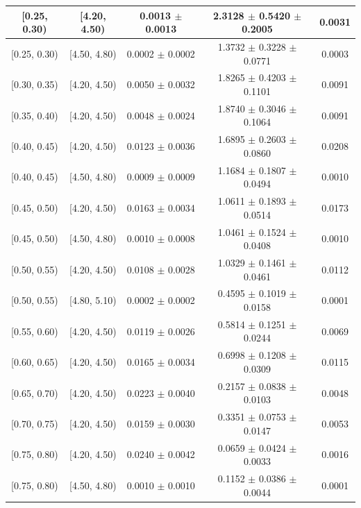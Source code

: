 \begin{longtable}{|c|c|c|c|c|}
\hline
\endlastfoot
[0.25, 0.30) & [4.20, 4.50) & 0.0013 $\pm$ 0.0013 & 2.3128 $\pm$ 0.5420 $\pm$ 0.2005 & 0.0031 \\ 
\hline
[0.25, 0.30) & [4.50, 4.80) & 0.0002 $\pm$ 0.0002 & 1.3732 $\pm$ 0.3228 $\pm$ 0.0771 & 0.0003 \\ 
\hline
[0.30, 0.35) & [4.20, 4.50) & 0.0050 $\pm$ 0.0032 & 1.8265 $\pm$ 0.4203 $\pm$ 0.1101 & 0.0091 \\ 
\hline
[0.35, 0.40) & [4.20, 4.50) & 0.0048 $\pm$ 0.0024 & 1.8740 $\pm$ 0.3046 $\pm$ 0.1064 & 0.0091 \\ 
\hline
[0.40, 0.45) & [4.20, 4.50) & 0.0123 $\pm$ 0.0036 & 1.6895 $\pm$ 0.2603 $\pm$ 0.0860 & 0.0208 \\ 
\hline
[0.40, 0.45) & [4.50, 4.80) & 0.0009 $\pm$ 0.0009 & 1.1684 $\pm$ 0.1807 $\pm$ 0.0494 & 0.0010 \\ 
\hline
[0.45, 0.50) & [4.20, 4.50) & 0.0163 $\pm$ 0.0034 & 1.0611 $\pm$ 0.1893 $\pm$ 0.0514 & 0.0173 \\ 
\hline
[0.45, 0.50) & [4.50, 4.80) & 0.0010 $\pm$ 0.0008 & 1.0461 $\pm$ 0.1524 $\pm$ 0.0408 & 0.0010 \\ 
\hline
[0.50, 0.55) & [4.20, 4.50) & 0.0108 $\pm$ 0.0028 & 1.0329 $\pm$ 0.1461 $\pm$ 0.0461 & 0.0112 \\ 
\hline
[0.50, 0.55) & [4.80, 5.10) & 0.0002 $\pm$ 0.0002 & 0.4595 $\pm$ 0.1019 $\pm$ 0.0158 & 0.0001 \\ 
\hline
[0.55, 0.60) & [4.20, 4.50) & 0.0119 $\pm$ 0.0026 & 0.5814 $\pm$ 0.1251 $\pm$ 0.0244 & 0.0069 \\ 
\hline
[0.60, 0.65) & [4.20, 4.50) & 0.0165 $\pm$ 0.0034 & 0.6998 $\pm$ 0.1208 $\pm$ 0.0309 & 0.0115 \\ 
\hline
[0.65, 0.70) & [4.20, 4.50) & 0.0223 $\pm$ 0.0040 & 0.2157 $\pm$ 0.0838 $\pm$ 0.0103 & 0.0048 \\ 
\hline
[0.70, 0.75) & [4.20, 4.50) & 0.0159 $\pm$ 0.0030 & 0.3351 $\pm$ 0.0753 $\pm$ 0.0147 & 0.0053 \\ 
\hline
[0.75, 0.80) & [4.20, 4.50) & 0.0240 $\pm$ 0.0042 & 0.0659 $\pm$ 0.0424 $\pm$ 0.0033 & 0.0016 \\ 
\hline
[0.75, 0.80) & [4.50, 4.80) & 0.0010 $\pm$ 0.0010 & 0.1152 $\pm$ 0.0386 $\pm$ 0.0044 & 0.0001 \\ 
\hline
\end{longtable}
